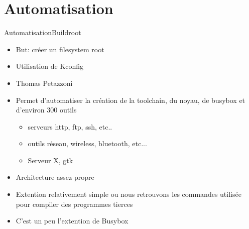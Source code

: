 


\section{Automatisation}

\begin{frame}[fragile=singleslide]{Automatisation}{Buildroot}
  \begin{itemize}
  \item But: créer un filesystem root
  \item Utilisation de Kconfig
  \item Thomas Petazzoni
  \item Permet d'automatiser la création  de la toolchain, du noyau,
    de busybox et d'environ 300 outils
    \begin{itemize}
    \item serveurs http, ftp, ssh, etc..
    \item outils réseau, wireless, bluetooth, etc...
    \item Serveur X, gtk
    \end{itemize}
  \item Architecture assez propre
  \item Extention relativement simple ou nous retrouvons les commandes
    utilisée pour compiler des programmes tierces
  \item C'est un peu l'extention de Busybox
  \end{itemize}
\end{frame}

